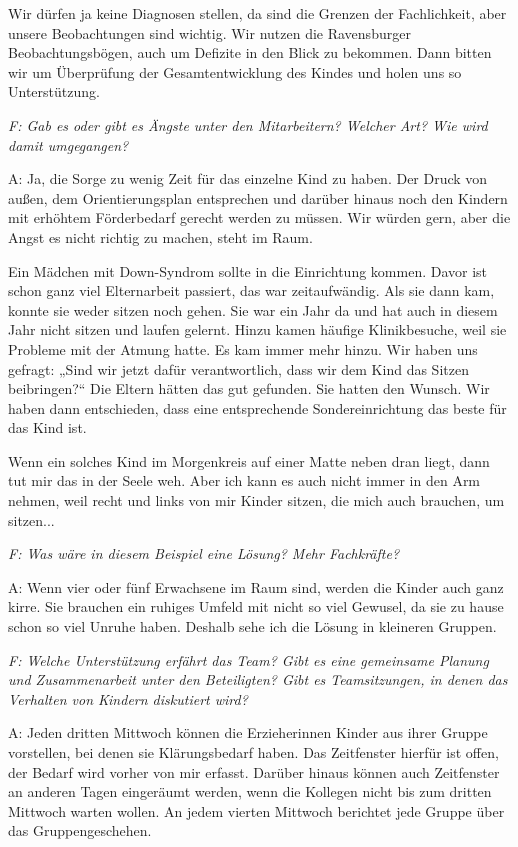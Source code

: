 \begin{linenumbers*}
Wir dürfen ja keine Diagnosen stellen, da sind die Grenzen der Fachlichkeit, aber unsere Beobachtungen sind wichtig. Wir nutzen die Ravensburger Beobachtungsbögen, auch um Defizite in den Blick zu bekommen. Dann bitten wir um Überprüfung der Gesamtentwicklung des Kindes und holen uns so Unterstützung.   

\emph{F: Gab es oder gibt es Ängste unter den Mitarbeitern? Welcher Art? Wie wird damit umgegangen?}

A: Ja, die Sorge zu wenig Zeit für das einzelne Kind zu haben. Der Druck von außen, dem Orientierungsplan entsprechen und darüber hinaus noch den Kindern mit erhöhtem Förderbedarf gerecht werden zu müssen.
Wir würden gern, aber die Angst es nicht richtig zu machen, steht im Raum.  

Ein Mädchen mit Down-Syndrom sollte in die Einrichtung kommen. Davor ist schon ganz viel Elternarbeit passiert, das war zeitaufwändig. Als sie dann kam, konnte sie weder sitzen noch gehen. Sie war ein Jahr da und hat auch in diesem Jahr nicht sitzen und laufen gelernt. Hinzu kamen häufige Klinikbesuche, weil sie Probleme mit der Atmung hatte. Es kam immer mehr hinzu. Wir haben uns gefragt: „Sind wir jetzt dafür verantwortlich, dass wir dem Kind das Sitzen beibringen?“ Die Eltern hätten das gut gefunden. Sie hatten den Wunsch. Wir haben dann entschieden, dass eine entsprechende Sondereinrichtung das beste für das Kind ist.  

Wenn ein solches Kind im Morgenkreis auf einer Matte neben dran liegt, dann tut mir das in der Seele weh. Aber ich kann es auch nicht immer in den Arm nehmen, weil recht und links von mir Kinder sitzen, die mich auch brauchen, um sitzen... 

\emph{F: Was wäre in diesem Beispiel eine Lösung? Mehr Fachkräfte?}

A: Wenn vier oder fünf Erwachsene im Raum sind, werden die Kinder auch ganz kirre. Sie brauchen ein ruhiges Umfeld mit nicht so viel Gewusel, da sie zu hause schon so viel Unruhe haben. Deshalb sehe ich die Lösung in kleineren Gruppen.  

\emph{F: Welche Unterstützung erfährt das Team? 
Gibt es eine gemeinsame Planung und Zusammenarbeit unter den Beteiligten? Gibt es Teamsitzungen, in denen das Verhalten von Kindern diskutiert wird?}
 
A: Jeden dritten Mittwoch können die Erzieherinnen Kinder aus ihrer Gruppe vorstellen, bei denen sie Klärungsbedarf haben. Das Zeitfenster hierfür ist offen, der Bedarf wird vorher von mir erfasst. Darüber hinaus können auch Zeitfenster an anderen Tagen eingeräumt werden, wenn die Kollegen nicht bis zum dritten Mittwoch warten wollen. An jedem vierten Mittwoch berichtet jede Gruppe über das Gruppengeschehen. 


\end{linenumbers*}
